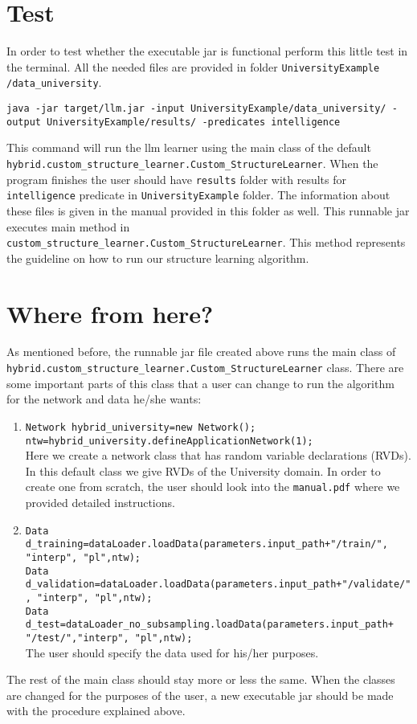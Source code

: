 \documentclass[12pt]{article}
\begin{document}
\section{Test}
In order to test whether the executable jar is functional perform this little test in the terminal. All the needed files are provided in folder
\texttt{UniversityExample /data\_university}.
\begin{center}
 \texttt{java -jar target/llm.jar -input UniversityExample/data\_university/ -output UniversityExample/results/ -predicates intelligence}
\end{center}
This command will run the llm learner using the main class of the default \texttt{hybrid.custom\_structure\_learner.Custom\_StructureLearner}.
When the program finishes the user should have \texttt{results} folder with results for \texttt{intelligence} predicate in \texttt{UniversityExample} folder. The information about these files is 
given in the manual provided in this folder as well.
This runnable jar executes main method in \texttt{custom\_structure\_learner.Custom\_StructureLearner}. This method represents the guideline on how to run
our structure learning algorithm.

\section{Where from here?}
As mentioned before, the runnable jar file created above runs the main class of \texttt{hybrid.custom\_structure\_learner.Custom\_StructureLearner} class. 
There are some important parts of this class that a user can change to run the algorithm for the network and data he/she wants:

\begin{enumerate}
 \item \texttt{Network hybrid\_university=new Network();\\
		ntw=hybrid\_university.defineApplicationNetwork(1);}\\
       Here we create a network class that has random variable declarations (RVDs). In this default class we give RVDs of the University domain.
       In order to create one from scratch, the user should look into the \texttt{manual.pdf} where we provided detailed instructions.
 \item \texttt{Data d\_training=dataLoader.loadData(parameters.input\_path+"/train/", "interp", "pl",ntw);\\
	    Data d\_validation=dataLoader.loadData(parameters.input\_path+"/validate/", "interp", "pl",ntw);\\
	    Data d\_test=dataLoader\_no\_subsampling.loadData(parameters.input\_path+ "/test/","interp", "pl",ntw);}\\
	    The user should specify the data used for his/her purposes.	    
\end{enumerate}
The rest of the main class should stay more or less the same. When the classes are changed for the purposes of the user, 
a new executable jar should be made with the procedure explained above.
\end{document}
